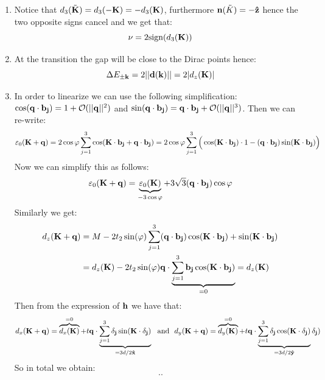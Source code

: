 \documentclass[10pt,a4paper]{article}
\begin{document}
\begin{enumerate}
\item Notice that $d_3(\tilde{\vb{K}}) = d_3(-\vb{K}) = - d_3(\vb{K})$, furthermore $\vb{n}(\tilde{K}) = - \vu{z}$ hence the two opposite signs cancel and we get that:
\[
\nu = 2 \text{sign}(d_3(\vb{K}))
\]

\item At the transition the gap will be close to the Dirac points hence:
\[
\Delta E_{\pm \vb{k}} = 2 || \vb{d}(\vb{k})|| = 2 | d_z(\vb{K}) |
\]

\item In order to linearize we can use the following simplification: $\cos(\vb{q} \cdot \vb{b_j}) = 1 + \mathcal{O}(||\vb{q}||^2)$ and $\sin(\vb{q} \cdot \vb{b_j}) = \vb{q} \cdot \vb{b_j} + \mathcal{O}(||\vb{q}||^3)$. Then we can re-write:
\[
\varepsilon_0(\vb{K} + \vb{q}) = 2\cos\varphi \sum_{j = 1}^3 \cos(\vb{K} \cdot \vb{b_j} + \vb{q} \cdot \vb{b_j}) = 2 \cos\varphi \sum_{j = 1}^3 \Big( \cos(\vb{K} \cdot \vb{b_j}) \cdot 1 - (\vb{q} \cdot \vb{b_j}) \sin(\vb{K} \cdot \vb{b_j})  \Big)
\] 
Now we can simplify this as follows:
\[
\varepsilon_0(\vb{K} + \vb{q}) = \underbrace{\varepsilon_0(\vb{K})}_{-3 \cos \varphi} + 3 \sqrt{3} (\vb{q} \cdot \vb{b_j})\cos\varphi 
\]
Similarly we get:
\begin{align*}
d_z(\vb{K} + \vb{q}) &= M - 2 t_2 \sin(\varphi) \sum_{j = 1}^3 (\vb{q} \cdot \vb{b_j})\cos(\vb{K} \cdot \vb{b_j}) + \sin(\vb{K} \cdot \vb{b_j}) \\
&= d_z(\vb{K}) - 2 t_2 \sin(\varphi) \vb{q} \cdot \underbrace{\sum_{j = 1}^3 \vb{b_j} \cos(\vb{K} \cdot \vb{b_j})}_{= 0} = d_z(\vb{K})
\end{align*}
Then from the expression of $\vb{h}$ we have that:
\[
d_x(\vb{K} + \vb{q}) = \overbrace{d_x(\vb{K})}^{= 0} + t \vb{q} \cdot \underbrace{\sum_{j = 1}^3 \vb{\delta_j} \sin(\vb{K} \cdot \vb{\delta_j})}_{= 3d/2 \vu{x}}  \mbox{~~and~~} d_y(\vb{K} + \vb{q}) = \overbrace{d_y(\vb{K})}^{= 0} + t \vb{q} \cdot \underbrace{\sum_{j = 1}^3 \vb{\delta_j} \cos(\vb{K} \cdot \vb{\delta_j})}_{= 3d/2 \vu{y}}  \vb{\delta_j}) 
\]
So in total we obtain:
\[
..
\]

\end{enumerate}
\end{document}
